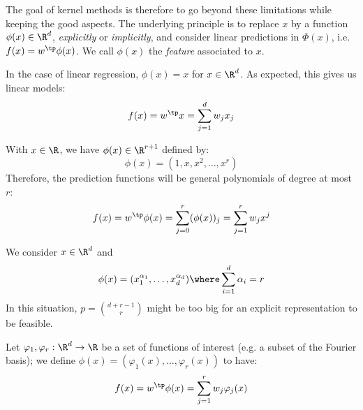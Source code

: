 \documentclass[toc, titlepaged]{../cs-classes/cs-classes}
\begin{document}
The goal of kernel methods is therefore to go beyond these limitations while keeping the good aspects. The underlying principle is to replace $x$ by a function $\phi(x)\in\R^d$, \emph{explicitly} or \emph{implicitly}, and consider linear predictions in $\Phi(x)$, i.e.~$f(x)=w^\tp \phi(x)$. We call $\phi(x)$ the \emph{feature} associated to $x$.

\begin{example}
    In the case of linear regression, $\phi(x)=x$ for $x\in\R^d$. As expected, this gives us linear models:
    \begin{equation*}
        f(x)=w^\tp x = \sum_{j=1}^d w_jx_j
    \end{equation*}
\end{example}

\begin{example}
    With $x\in\R$, we have $\phi(x)\in\R^{r+1}$ defined by:
    \begin{equation*}
        \phi(x)=(1, x, x^2, \dots, x^r)
    \end{equation*}
    Therefore, the prediction functions will be general polynomials of degree at most $r$:
    \begin{equation*}
        f(x)=w^\tp\phi(x)=\sum_{j=0}^r (\phi(x))_j = \sum_{j=1}^r w_jx^j
    \end{equation*}
\end{example}

\begin{example}
    We consider $x\in\R^d$ and
    \begin{equation*}
        \phi(x)=(x_1^{\alpha_1}, \dots, x_d^{\alpha_d}) \where \sum_{i=1}^d \alpha_i=r
    \end{equation*}
    In this situation, $p=\binom{d+r-1}{r}$ might be too big for an explicit representation to be feasible.
\end{example}

\begin{example}
    Let $\varphi_1, \varphi_r : \R^d \to \R$ be a set of functions of interest (e.g. a subset of the Fourier basis); we define $\phi(x) = (\varphi_1(x), \dots, \varphi_r(x))$ to have:
    \begin{equation*}
        f(x)=w^\tp \phi(x) = \sum_{j=1}^rw_j\varphi_j(x)
    \end{equation*}
\end{example}
\end{document}
